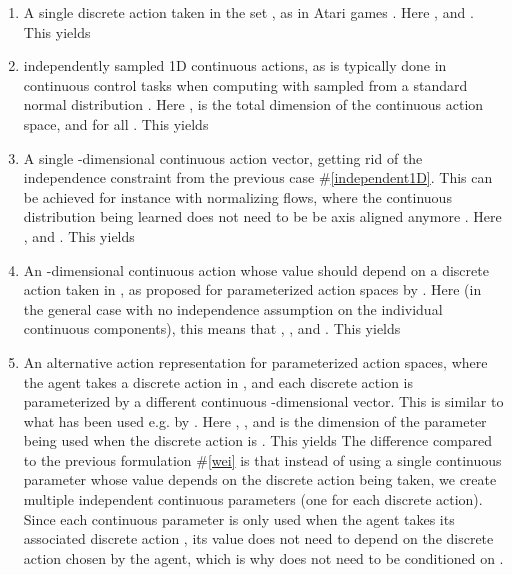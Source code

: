 \documentclass[letterpaper]{article} \usepackage{aaai20}  \usepackage{times}  \usepackage{helvet} \usepackage{courier}  \usepackage[hyphens]{url}  \usepackage{graphicx} \urlstyle{rm} \def\UrlFont{\rm}  \usepackage{graphicx}  \usepackage[section]{placeins}
\newcommand{\citet}{\cite}  \newcommand{\citep}{\cite} \DeclareMathOperator*{\softmax}{softmax}
\begin{document}
\begin{enumerate}
    \item \label{singlediscrete} A single discrete action taken in the set , as in Atari games \citep{bellemare2013}.
    Here ,  and .
    This yields 
    
    \item \label{independent1D}  independently sampled 1D continuous actions, as is typically done in continuous control tasks when computing  with  sampled from a standard normal distribution \citep{haarnoja2018soft}.
    Here ,  is the total dimension of the continuous action space, and  for all .
    This yields 
    
    \item A single -dimensional continuous action vector, getting rid of the independence constraint from the previous case \#\ref{independent1D}.
    This can be achieved for instance with normalizing flows, where the continuous distribution being learned does not need to be be axis aligned anymore \citep{mazoure2019leveraging}.
    Here ,  and .
    This yields 
    
    \item \label{wei}An -dimensional continuous action whose value should depend on a discrete action taken in , as proposed for parameterized action spaces by \citet{wei2018}.
    Here (in the general case with no independence assumption on the individual continuous components), this means that , ,  and .
    This yields 
    
    \item \label{paramactions} An alternative action representation for parameterized action spaces, where the agent takes a discrete action in , and each discrete action  is parameterized by a different continuous -dimensional vector.
    This is similar to what has been used e.g. by \citet{bester2019}.
    Here , ,  and  is the dimension of the parameter being used when the discrete action is .
    This yields 
    The difference compared to the previous formulation \#\ref{wei} is that instead of using a single continuous parameter whose value depends on the discrete action being taken, we create multiple independent continuous parameters (one for each discrete action).
    Since each continuous parameter  is only used when the agent takes its associated discrete action , its value does not need to depend on the discrete action chosen by the agent, which is why  does not need to be conditioned on .
    

\end{enumerate}
\end{document}
